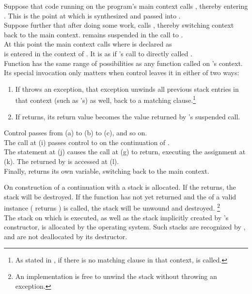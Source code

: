 Suppose that code running on the program's main context calls ,
thereby entering . This is the point at which  is synthesized
and passed into .\\
Suppose further that after doing some work,  calls ,
thereby switching context back to the main context.  remains suspended
in the call to .\\
At this point the main context calls 
where  is declared as\\
  is entered in the context of .
It is as if 's call to  directly called .\\
Function  has the same range of possibilities as any function called on
's context. Its special invocation only matters when control leaves it
in either of two ways:

\begin{enumerate}
  \item If  throws an exception, that exception unwinds all previous
        stack entries in that context (such as 's) as well, back to a
        matching  clause.\footnote{As stated in ,
        if there is no matching  clause in that context,
         is called.}
  \item If  returns, its return value becomes the value returned by
        's suspended  call.
\end{enumerate}


Control passes from (a) to (b) to (c), and so on.\\
The  call at (i) passes control
to  on the continuation of .\\
The  statement at (j) causes the \resume call at (g) to return,
executing the assignment at (k). The  returned by  is
accessed at (l).\\
Finally,  returns its own  variable, switching back to the main
context.


\label{subsec:destruction}
On construction of a continuation with \call a stack is allocated. If the
\entryfn returns, the stack will be destroyed. If the function has not
yet returned and the  of a valid \cont instance (\opbool
returns ) is called, the stack will be unwound and destroyed.
\footnote{An implementation is free to unwind the stack without throwing an
exception.}\\
The stack on which  is executed, as well as the stack implicitly
created by 's constructor, is allocated by the operating
system. Such stacks are recognized by \cont, and are not deallocated by its
destructor.


